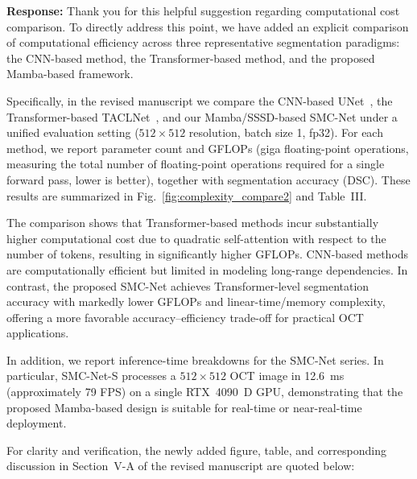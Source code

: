 \documentclass[11pt]{article}
\newcommand{\commentresponse}[2]{{\color{blue}\textbf{Response:} #2}}
\begin{document}
\begin{enumerate}
    \commentresponse{5}{
    Thank you for this helpful suggestion regarding computational cost comparison.
    To directly address this point, we have added an explicit comparison of computational efficiency across three representative segmentation paradigms: the CNN-based method, the Transformer-based method, and the proposed Mamba-based framework.
    
    Specifically, in the revised manuscript we compare the CNN-based UNet~\cite{ronneberger2015u}, the Transformer-based TACLNet~\cite{wen2024}, and our Mamba/SSSD-based SMC-Net under a unified evaluation setting ($512\times512$ resolution, batch size 1, fp32).
    For each method, we report parameter count and GFLOPs (giga floating-point operations, measuring the total number of floating-point operations required for a single forward pass, lower is better), together with segmentation accuracy (DSC).
    These results are summarized in Fig.~\ref{fig:complexity_compare2} and Table~III.
    
    The comparison shows that Transformer-based methods incur substantially higher computational cost due to quadratic self-attention with respect to the number of tokens, resulting in significantly higher GFLOPs.
    CNN-based methods are computationally efficient but limited in modeling long-range dependencies.
    In contrast, the proposed SMC-Net achieves Transformer-level segmentation accuracy with markedly lower GFLOPs and linear-time/memory complexity, offering a more favorable accuracy--efficiency trade-off for practical OCT applications.
    
    In addition, we report inference-time breakdowns for the SMC-Net series.
    In particular, SMC-Net-S processes a $512\times512$ OCT image in 12.6~ms (approximately 79 FPS) on a single RTX~4090~D GPU, demonstrating that the proposed Mamba-based design is suitable for real-time or near-real-time deployment.
    
    For clarity and verification, the newly added figure, table, and corresponding discussion in Section~V-A of the revised manuscript are quoted below:

}
\end{enumerate}
\end{document}
